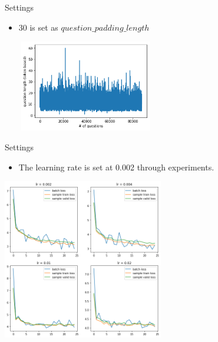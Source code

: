 \documentclass{beamer}
\begin{document}
\begin{frame}{Settings}
    \begin{itemize}
        \item 30 is set as $question\_padding\_length$
            \begin{center}
                \includegraphics[width=6cm, height=4cm]{figures/question_length.png}
            \end{center}
    \end{itemize}
\end{frame}

\begin{frame}{Settings}
    \begin{itemize}
        \item The learning rate is set at 0.002 through experiments.
    \end{itemize}
    \begin{center}
        \includegraphics[width=7cm, height=7cm]{figures/lr.png}
    \end{center}
\end{frame}
\end{document}
